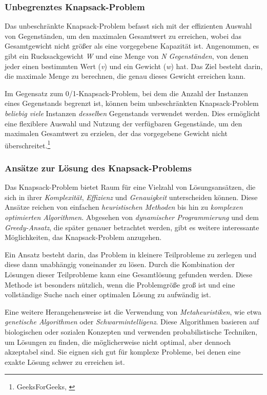 \subsubsection*{Unbegrenztes Knapsack-Problem}
Das unbeschränkte Knapsack-Problem befasst sich mit der effizienten Auswahl von Gegenständen, um den maximalen Gesamtwert
zu erreichen, wobei das Gesamtgewicht nicht größer als eine vorgegebene Kapazität ist. Angenommen, es gibt ein
Rucksackgewicht \textit{W} und eine Menge von \textit{N Gegenständen}, von denen jeder einen bestimmten Wert (\textit{v})
und ein Gewicht (\textit{w}) hat. Das Ziel besteht darin, die maximale Menge zu berechnen, die genau dieses Gewicht
erreichen kann.

Im Gegensatz zum 0/1-Knapsack-Problem, bei dem die Anzahl der Instanzen eines Gegenstands begrenzt ist, können beim
unbeschränkten Knapsack-Problem \textit{beliebig viele} Instanzen \textit{desselben} Gegenstands verwendet werden. Dies
ermöglicht eine flexiblere Auswahl und Nutzung der verfügbaren Gegenstände, um den maximalen Gesamtwert zu erzielen, der
das vorgegebene Gewicht nicht überschreitet.\footnote{GeeksForGeeks, \cite{Introduction to Knapsack Problem, its Types and How to solve them}}

\subsubsection{Ansätze zur Lösung des Knapsack-Problems}
Das Knapsack-Problem bietet Raum für eine Vielzahl von Lösungsansätzen, die sich in ihrer \textit{Komplexität}, \textit{Effizienz}
und \textit{Genauigkeit} unterscheiden können. Diese Ansätze reichen von einfachen \textit{heuristischen Methoden} bis
hin zu \textit{komplexen optimierten Algorithmen}. Abgesehen von \textit{dynamischer Programmierung} und dem \textit{Greedy-Ansatz},
die später genauer betrachtet werden, gibt es weitere interessante Möglichkeiten, das Knapsack-Problem anzugehen.

Ein Ansatz besteht darin, das Problem in kleinere Teilprobleme zu zerlegen und diese dann unabhängig voneinander zu lösen.
Durch die Kombination der Lösungen dieser Teilprobleme kann eine Gesamtlösung gefunden werden. Diese Methode ist besonders
nützlich, wenn die Problemgröße groß ist und eine vollständige Suche nach einer optimalen Lösung zu aufwändig ist.

Eine weitere Herangehensweise ist die Verwendung von \textit{Metaheuristiken}, wie etwa \textit{genetische Algorithmen}
oder \textit{Schwarmintelligenz}. Diese Algorithmen basieren auf biologischen oder sozialen Konzepten und verwenden
probabilistische Techniken, um Lösungen zu finden, die möglicherweise nicht optimal, aber dennoch akzeptabel sind. Sie
eignen sich gut für komplexe Probleme, bei denen eine exakte Lösung schwer zu erreichen ist.

